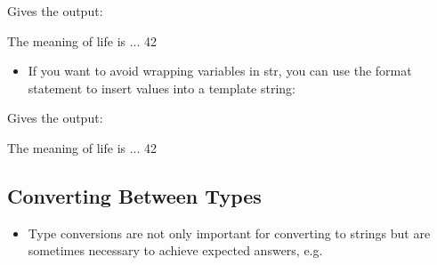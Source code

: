 \documentclass[letterpaper,10pt,english,openany]{sphinxmanual}
\begin{document}
\begin{sphinxVerbatim}[commandchars=\\\{\}]
  
  
  
\end{sphinxVerbatim}

Gives the output:

\begin{sphinxVerbatim}[commandchars=\\\{\}]
The meaning of life is ... 42
\end{sphinxVerbatim}
\begin{itemize}
\item {} 
If you want to avoid wrapping variables in str, you can use the
format statement to insert values into a template string:

\end{itemize}

\begin{sphinxVerbatim}[commandchars=\\\{\}]
  
\end{sphinxVerbatim}

Gives the output:

\begin{sphinxVerbatim}[commandchars=\\\{\}]
The meaning of life is ... 42
\end{sphinxVerbatim}


\subsection{Converting Between Types}
\label{\detokenize{introduction_to_python/type_conversions:converting-between-types}}\begin{itemize}
\item {} 
Type conversions are not only important for converting to strings but
are sometimes necessary to achieve expected answers, e.g.

\end{itemize}
\end{document}
